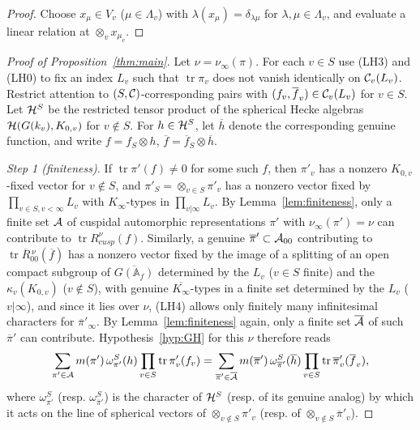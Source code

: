 \documentclass[12pt,letterpaper,openany]{book}
\theoremstyle{plain}
\theoremstyle{definition}
\theoremstyle{remark}
\theoremstyle{remark}
\newcommand{\tr}{\operatorname{tr}}
\begin{document}
\begin{proof} Choose $x_{\mu}\in V_v$ ($\mu\in\Lambda_v$) with
$\lambda(x_\mu)=\delta_{\lambda\mu}$ for $\lambda,\mu\in\Lambda_v$, and
evaluate a linear relation at $\otimes_v x_{\mu_v}$.
\end{proof}

\begin{proof}[Proof of Proposition~\ref{thm:main}]
Let $\nu=\nu_\infty(\pi)$.
For each $v\in S$ use (LH3) and (LH0) to fix an index $L_v$ such that
$\tr \pi_v$ does not vanish identically on ${\cal C}_v(L_v)$.
Restrict attention to $(S,{\cal C})$-corresponding pairs with
$(f_v,\overline{f}_v)\in{\cal C}_v(L_v)$ for $v\in S$. Let ${\cal H}^S$ be
the restricted tensor product of the spherical Hecke algebras
${\cal H}(G(k_v),K_{0,v})$ for $v\notin S$. For $h\in{\cal H}^S$, let
$\overline{h}$ denote the corresponding genuine function, and write
$f=f_S\otimes h$, $\overline{f}=\overline{f}_S\otimes\overline{h}$.

{\em Step 1 (finiteness).} If $\tr \pi'(f)\neq 0$ for some such $f$,
then $\pi'_v$ has a nonzero $K_{0,v}$-fixed vector for $v\notin S$, and
$\pi'_S=\otimes_{v\in S}\pi'_v$ has a nonzero vector fixed by
$\prod_{v\in S, v<\infty}L_v$ with $K_\infty$-types in $\prod_{v|\infty}L_v$.
By Lemma~\ref{lem:finiteness}, only a finite set ${\cal A}$ of cuspidal
automorphic representations $\pi'$ with $\nu_\infty(\pi')=\nu$ can
contribute to $\tr R^\nu_{cusp}(f)$. Similarly, a genuine
$\overline\pi'\subset{\cal A}_{00}$
contributing to $\tr\overline R{}^{\,\nu}_{00}(\overline f)$ has a nonzero
vector fixed by the image of a splitting of an open compact subgroup of
$\overline{G({\mathbb A}_f)}$ determined by the $L_v$ ($v\in S$ finite) and
the $\kappa_v(K_{0,v})$ ($v\notin S$), with genuine $\overline{K_\infty}$-types
in a finite set determined by the $L_v$ ($v|\infty$), and since it lies
over $\nu$, (LH4) allows only finitely many infinitesimal characters for
$\overline\pi'_\infty$. By Lemma~\ref{lem:finiteness} again, only a finite
set $\overline{{\cal A}}$ of such $\overline\pi'$ can contribute.
Hypothesis~\ref{hyp:GH} for this $\nu$
therefore reads
\begin{equation}\label{eq:finite-identity}
\sum_{\pi'\in{\cal A}}m(\pi')\,\omega_{\pi'}^S(h)
\prod_{v\in S}\tr \pi'_v(f_v)
=\sum_{\overline{\pi}'\in\overline{{\cal A}}}m(\overline{\pi}')\,
\omega_{\overline{\pi}'}^S(\overline{h})
\prod_{v\in S}\tr \overline{\pi}'_v(\overline{f}_v),
\end{equation}
where $\omega_{\pi'}^S$ (resp. $\omega_{\overline{\pi}'}^S$) is the
character of ${\cal H}^S$ (resp. of its genuine analog) by which it acts
on the line of spherical vectors of $\otimes_{v\notin S}\pi'_v$ (resp. of
$\otimes_{v\notin S}\overline{\pi}'_v$).


\end{proof}
\end{document}
